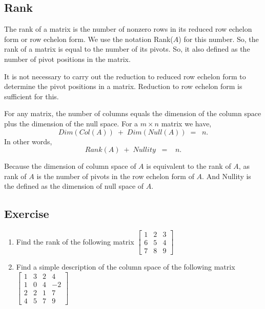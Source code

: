\documentclass[math101_lecturenotes_ku.tex]{subfiles}
\begin{document}
\subsection{Rank}
\begin{definition}
The rank of a matrix is the number of nonzero rows in its reduced row echelon form or row echelon form. We use the notation Rank($A$) for this number. So, the rank of a matrix is equal to the number of its pivots. So, it also defined as the number of pivot positions in the matrix.
\end{definition}
\begin{remark}
  It is not necessary to carry out the reduction to reduced row echelon form to determine the pivot positions in a matrix. Reduction to row echelon form is sufficient for this.
\end{remark}
\begin{mdframed}
\begin{theorem}
For any matrix, the number of columns equals the dimension of the column space plus the dimension of the null space. For a $m \times n$ matrix we have, $$ Dim(Col(A))\; + \; Dim(Null(A)) \; = \;\;n. $$
In other words,
$$Rank(A) \; +\; Nullity\;\; = \;\;\; n.$$
\end{theorem}
\end{mdframed}
Because the dimension of column space of \(A\) is equivalent to the rank of \(A\), as rank of \(A\) is the number of pivots in the row echelon form of \(A\). And Nullity is the defined as the dimension of null space of \(A\).

\subsection{Exercise}
\begin{enumerate}

\item Find the rank of the following matrix
$\displaystyle \begin{bmatrix}
    1 & 2 & 3 \\
    6 & 5 &4 \\
    7 & 8 & 9
\end{bmatrix}$

\item Find a simple description of the column space of the following matrix $\begin{bmatrix}
    1 & 3 & 2 & 4 \\
    1 & 0 & 4 & -2 \\
    2 & 2 & 1 & 7 \\
    4 & 5 & 7 & 9
\end{bmatrix}$
\end{enumerate}
\end{document}
